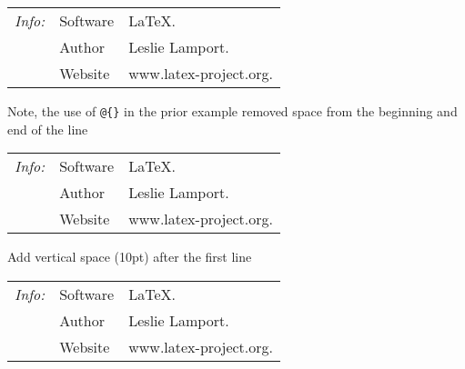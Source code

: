 \documentclass{article}
\begin{document}
\begin{tabular}{@{}>{\itshape}ll!{:}l<{.}@{}}
  \hline
  Info: & Software & \LaTeX\\
  & Author & Leslie Lamport\\
  & Website & www.latex-project.org\\
  \hline
\end{tabular}

\noindent
Note, the use of \verb|@{}| in the prior example removed space from the beginning and end of the line

\setlength{\extrarowheight}{0pt}

\begin{tabular}{>{\itshape}ll!{:}l<{.}}
  \hline
  Info: & Software & \LaTeX\\
  & Author & Leslie Lamport\\
  & Website & www.latex-project.org\\
  \hline
\end{tabular}

\noindent
Add vertical space (10pt) after the first line

\begin{tabular}{>{\itshape}ll!{:}l<{.}}
  \hline
  Info: & Software & \LaTeX\\[10pt]
  & Author & Leslie Lamport\\
  & Website & www.latex-project.org\\
  \hline
\end{tabular}
\end{document}
